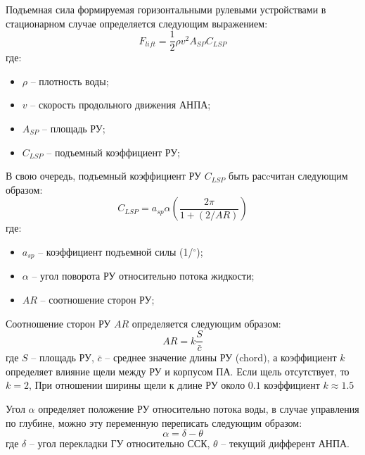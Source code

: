 Подъемная сила формируемая горизонтальными рулевыми устройствами в стационарном случае определяется следующим выражением:
\begin{equation}
    F_{lift} = \frac{1}{2}\rho v^2 A_{SP} C_{LSP}
\end{equation}
\noindent где:
\begin{itemize}
    \item $\rho$ -- плотность воды;
    \item $v$ -- скорость продольного движения АНПА;
    \item $A_{SP}$ -- площадь РУ;
    \item $C_{LSP}$ -- подъемный коэффициент РУ;
\end{itemize}

В свою очередь, подъемный коэффициент РУ $C_{LSP}$ быть расcчитан следующим образом:
\begin{equation}
    C_{LSP} = a_{sp}\alpha \left( \frac{2 \pi}{1 + (2/AR)} \right)
\end{equation}
\noindent где:
\begin{itemize}
    \item $a_{sp}$ -- коэффициент подъемной силы (1/$^\circ$);
    \item $\alpha$ -- угол поворота РУ относительно потока жидкости;
    \item $AR$ -- соотношение сторон РУ;
\end{itemize}

Соотношение сторон РУ $AR$ определяется следующим образом:
\begin{equation}
    AR = k \frac{S}{\bar{c}}
\end{equation}
\noindent где $S$ -- площадь РУ, $\bar{c}$ -- среднее значение длины РУ (chord), а коэффициент $k$ определяет влияние щели между РУ и корпусом ПА. Если щель отсутствует, то $k=2$, При отношении ширины щели к длине РУ около $0.1$ коэффициент $k\approx1.5$

Угол $\alpha$ определяет положение РУ относительно потока воды, в случае управления по глубине, можно эту переменную переписать следующим образом:
\begin{equation}
    \alpha = \delta - \theta
\end{equation}
\noindent где $\delta$ -- угол перекладки ГУ относительно ССК, $\theta$ -- текущий дифферент АНПА.

